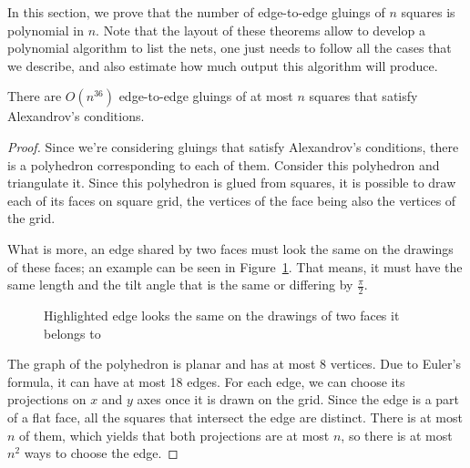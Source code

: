 \documentclass[a4paper,11pt]{article}
\begin{document}
In this section, we prove that the number of edge-to-edge gluings of $n$ squares is polynomial in $n$. Note that the layout of these theorems allow to develop a polynomial algorithm to list the nets, one just needs to follow all the cases that we describe, and also estimate how much output this algorithm will produce.

\begin{theorem} \label{thm:n36}
	There are $O \left( n^{36} \right)$ edge-to-edge gluings of at most $n$ squares that satisfy Alexandrov's conditions.
\end{theorem}

\begin{proof}
Since we're considering gluings that satisfy Alexandrov's conditions, there is a polyhedron corresponding to each of them. Consider this polyhedron and triangulate it. Since this polyhedron is glued from squares, it is possible to draw each of its faces on square grid, the vertices of the face being also the vertices of the grid.

What is more, an edge shared by two faces must look the same on the drawings of these faces; an example can be seen in Figure~\ref{fig:edgesMeeting}. That means, it must have the same length and the tilt angle that is the same or differing by $\frac{\pi}{2}$.

\begin{figure}[h] \centering
{}\hspace{1.2cm}
\caption{Highlighted edge looks the same on the drawings of two faces it belongs to}
\label{fig:edgesMeeting}
\end{figure}

The graph of the polyhedron is planar and has at most 8 vertices. Due to Euler's formula, it can have at most 18 edges. For each edge, we can choose its projections on $x$ and $y$ axes once it is drawn on the grid. Since the edge is a part of a flat face, all the squares that intersect the edge are distinct. There is at most $n$ of them, which yields that both projections are at most $n$, so there is at most $n^2$ ways to choose the edge.


\end{proof}
\end{document}
